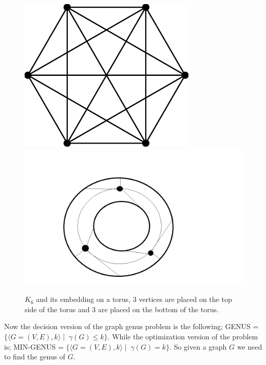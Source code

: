 \documentclass{article}
\begin{document}
    \begin{figure}[h]
        \includegraphics[scale = 0.5]{The-complete-graph-K-6.png} 
        \hspace*{1cm}
        \includegraphics[scale = 0.4]{torus k6.png} 
        \caption{$K_6$ and its embedding on a torus, 3 vertices are placed on the top side of the torus and 3 are placed on the bottom of the torus.}
        \label{Fig4}
    \end{figure}

    Now the decision version of the graph genus problem is the following; GENUS = $\{\langle G = (V, E), k\rangle\mid \; \gamma(G) \leq k\}$.
    While the optimization version of the problem is; MIN-GENUS = $\{\langle G = (V, E), k\rangle\mid \; \gamma(G) = k\}$.
    So given a graph $G$ we need to find the genus of $G$. 
\end{document}
